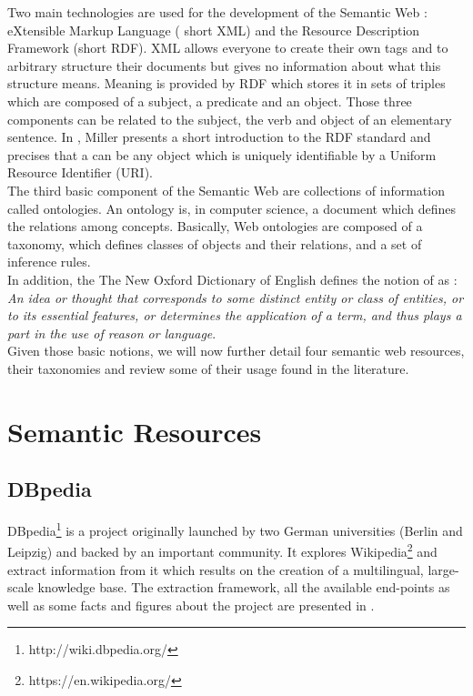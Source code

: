 Two main technologies are used for the development of the Semantic Web : eXtensible Markup Language ( short XML) and the Resource Description Framework (short RDF). XML allows everyone to create their own tags and to arbitrary structure their documents but gives no information about what this structure means. Meaning is provided by RDF which stores it in sets of triples which are composed of a subject, a predicate and an object. Those three components can be related to the subject, the verb and object of an elementary sentence. In \cite{miller1998introduction}, Miller presents a short introduction to the RDF standard and precises that a  can be any object which is uniquely identifiable by a Uniform Resource Identifier (URI).\\

The third basic component of the Semantic Web are collections of information called ontologies. An ontology is, in computer science, a document which defines the relations among concepts. Basically, Web ontologies are composed of a taxonomy, which defines classes of objects and their relations, and a set of inference rules.\\

In addition, the The New Oxford Dictionary of English defines the notion of  as : \emph{An idea or thought that corresponds to some distinct entity or class of entities, or to its essential features, or determines the application of a term, and thus plays a part in the use of reason or language}.\\

Given those basic notions, we will now further detail four semantic web resources, their taxonomies and review some of their usage found in the literature.

\section{Semantic Resources} %
\label{sec:semantic_resources}
\subsection{DBpedia} %
\label{sub:dbpedia}

DBpedia\footnote{http://wiki.dbpedia.org/} is a project originally launched by two German universities (Berlin and Leipzig) and backed by an important community. It explores Wikipedia\footnote{https://en.wikipedia.org/} and extract information from it which results on the creation of a multilingual, large-scale knowledge base. The extraction framework, all the available end-points as well as some facts and figures about the project are presented in \cite{lehmann2014dbpedia}.\\

